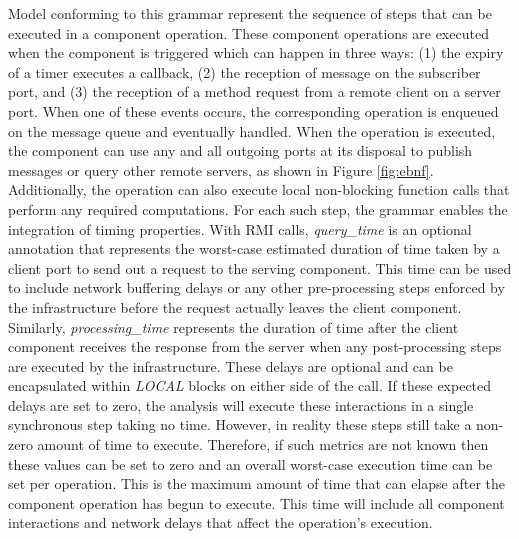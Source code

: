 Model conforming to this grammar represent the sequence of steps that can be executed in a component operation. These component operations are executed when the component is triggered which can happen in three ways: (1) the expiry of a timer executes a callback, (2) the reception of message on the subscriber port, and (3) the reception of a method request from a remote client on a server port. When one of these events occurs, the corresponding operation is enqueued on the message queue and eventually handled. When the operation is executed, the component can use any and all outgoing ports at its disposal to publish messages or query other remote servers, as shown in Figure \ref{fig:ebnf}. Additionally, the operation can also execute local non-blocking function calls that perform any required computations. For each such step, the grammar enables the integration of timing properties. With RMI calls, \emph{query\_time} is an optional annotation that represents the worst-case estimated duration of time taken by a client port to send out a request to the serving component. This time can be used to include network buffering delays or any other pre-processing steps enforced by the infrastructure before the request actually leaves the client component. Similarly, \emph{processing\_time} represents the duration of time after the client component receives the response from the server when any post-processing steps are executed by the infrastructure. These delays are optional and can be encapsulated within \emph{LOCAL} blocks on either side of the call. If these expected delays are set to zero, the analysis will execute these interactions in a single synchronous step taking no time. However, in reality these steps still take a non-zero amount of time to execute. Therefore, if such metrics are not known then these values can be set to zero and an overall worst-case execution time can be set per operation. This is the maximum amount of time that can elapse after the component operation has begun to execute. This time will include all component interactions and network delays that affect the operation's execution. 

